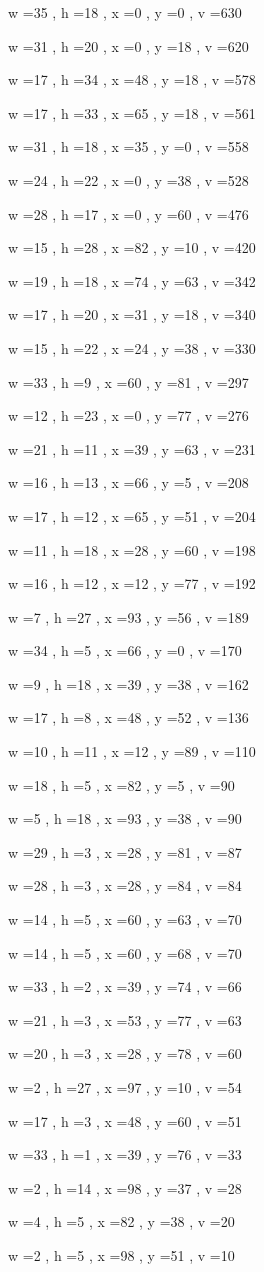 \documentclass[11pt]{article}
\begin{document}
w =35 , h =18 , x =0 , y =0 , v =630
\par
w =31 , h =20 , x =0 , y =18 , v =620
\par
w =17 , h =34 , x =48 , y =18 , v =578
\par
w =17 , h =33 , x =65 , y =18 , v =561
\par
w =31 , h =18 , x =35 , y =0 , v =558
\par
w =24 , h =22 , x =0 , y =38 , v =528
\par
w =28 , h =17 , x =0 , y =60 , v =476
\par
w =15 , h =28 , x =82 , y =10 , v =420
\par
w =19 , h =18 , x =74 , y =63 , v =342
\par
w =17 , h =20 , x =31 , y =18 , v =340
\par
w =15 , h =22 , x =24 , y =38 , v =330
\par
w =33 , h =9 , x =60 , y =81 , v =297
\par
w =12 , h =23 , x =0 , y =77 , v =276
\par
w =21 , h =11 , x =39 , y =63 , v =231
\par
w =16 , h =13 , x =66 , y =5 , v =208
\par
w =17 , h =12 , x =65 , y =51 , v =204
\par
w =11 , h =18 , x =28 , y =60 , v =198
\par
w =16 , h =12 , x =12 , y =77 , v =192
\par
w =7 , h =27 , x =93 , y =56 , v =189
\par
w =34 , h =5 , x =66 , y =0 , v =170
\par
w =9 , h =18 , x =39 , y =38 , v =162
\par
w =17 , h =8 , x =48 , y =52 , v =136
\par
w =10 , h =11 , x =12 , y =89 , v =110
\par
w =18 , h =5 , x =82 , y =5 , v =90
\par
w =5 , h =18 , x =93 , y =38 , v =90
\par
w =29 , h =3 , x =28 , y =81 , v =87
\par
w =28 , h =3 , x =28 , y =84 , v =84
\par
w =14 , h =5 , x =60 , y =63 , v =70
\par
w =14 , h =5 , x =60 , y =68 , v =70
\par
w =33 , h =2 , x =39 , y =74 , v =66
\par
w =21 , h =3 , x =53 , y =77 , v =63
\par
w =20 , h =3 , x =28 , y =78 , v =60
\par
w =2 , h =27 , x =97 , y =10 , v =54
\par
w =17 , h =3 , x =48 , y =60 , v =51
\par
w =33 , h =1 , x =39 , y =76 , v =33
\par
w =2 , h =14 , x =98 , y =37 , v =28
\par
w =4 , h =5 , x =82 , y =38 , v =20
\par
w =2 , h =5 , x =98 , y =51 , v =10
\par
\newpage
\end{document}
